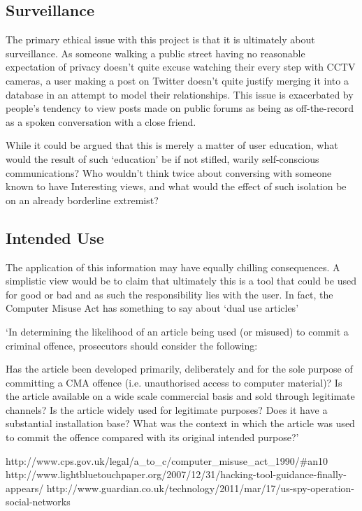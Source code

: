 \subsection{Surveillance}
The primary ethical issue with this project is that it is ultimately about surveillance. As someone walking a public street having no reasonable expectation of privacy doesn't quite excuse watching their every step with CCTV cameras, a user making a post on Twitter doesn't quite justify merging it into a database in an attempt to model their relationships. This issue is exacerbated by people's tendency to view posts made on public forums as being as off-the-record as a spoken conversation with a close friend.

While it could be argued that this is merely a matter of user education, what would the result of such `education' be if not stifled, warily self-conscious communications? Who wouldn't think twice about conversing with someone known to have Interesting views, and what would the effect of such isolation be on an already borderline extremist?

\subsection{Intended Use}
The application of this information may have equally chilling consequences. A simplistic view would be to claim that ultimately this is a tool that could be used for good or bad and as such the responsibility lies with the user.  In fact, the Computer Misuse Act has something to say about `dual use articles'

`In determining the likelihood of an article being used (or misused) to commit a criminal offence, prosecutors should consider the following:

    Has the article been developed primarily, deliberately and for the sole purpose of committing a CMA offence (i.e. unauthorised access to computer material)?
    Is the article available on a wide scale commercial basis and sold through legitimate channels?
    Is the article widely used for legitimate purposes?
    Does it have a substantial installation base?
    What was the context in which the article was used to commit the offence compared with its original intended purpose?'


http://www.cps.gov.uk/legal/a\_to\_c/computer\_misuse\_act\_1990/\#an10
http://www.lightbluetouchpaper.org/2007/12/31/hacking-tool-guidance-finally-appears/
http://www.guardian.co.uk/technology/2011/mar/17/us-spy-operation-social-networks

